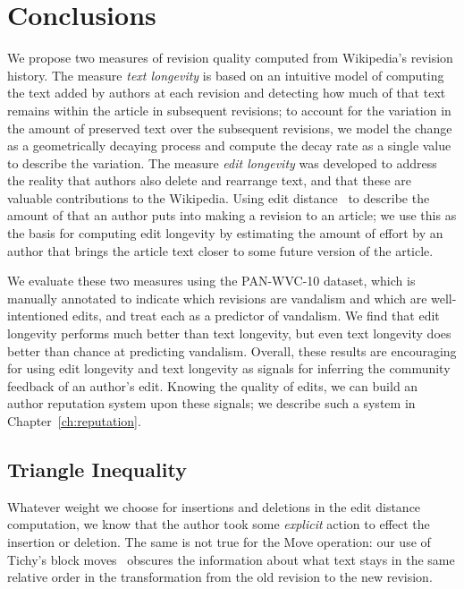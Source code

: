\section{Conclusions}

We propose two measures of revision quality computed
from Wikipedia's revision history.
The measure \textit{text longevity} is based on an intuitive
model of computing the text added by authors at each revision
and detecting how much of that text remains within the article
in subsequent revisions; to account for the variation in
the amount of preserved text over the subsequent revisions,
we model the change as a geometrically decaying process
and compute the decay rate as a single value to describe
the variation.
The measure \textit{edit longevity} was developed to address
the reality that authors also delete and rearrange text,
and that these are valuable contributions to the Wikipedia.
Using edit distance~\cite{Levenshtein1966} to describe the
amount of  that an author puts into making a
revision to an article; we use this as the basis for computing
edit longevity by estimating the amount of effort by an
author that brings the article text closer to some future
version of the article.

We evaluate these two measures using the PAN-WVC-10 dataset, which is
manually annotated to indicate which revisions are vandalism and which
are well-intentioned edits, and treat each as a predictor of vandalism.
We find that edit longevity performs much better than text longevity,
but even text longevity does better than chance at predicting vandalism.
Overall, these results are encouraging for using edit longevity and text
longevity as signals for inferring the community feedback of an author's
edit.  Knowing the quality of edits, we can build an author reputation
system upon these signals; we describe such a system in
Chapter~\ref{ch:reputation}.


\subsection{Triangle Inequality}


Whatever weight we choose for insertions and deletions in the edit
distance computation, we know that the author took some
\textit{explicit} action to effect the insertion or deletion.
The same is not true for the Move operation: our use of
Tichy's block moves~\cite{Tichy1984} obscures the information
about what text stays in the same relative order in the
transformation from the old revision to the new revision.


